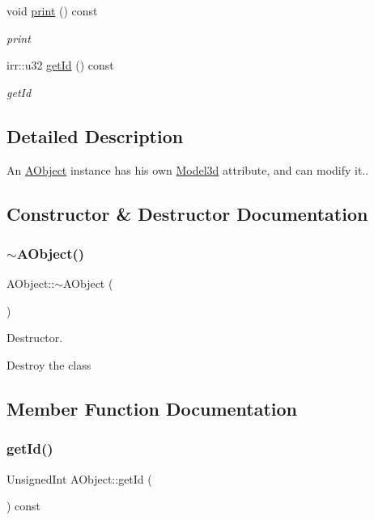 \begin{DoxyCompactItemize}
void \hyperlink{classAObject_aebbd61ad13e23fa7787a5cdf12acd4ca}{print} () const
\begin{DoxyCompactList}\small\item\em print \end{DoxyCompactList}\item 
irr\+::u32 \hyperlink{classAObject_acd8ce0e7b7009ec89998def42021b69f}{get\+Id} () const
\begin{DoxyCompactList}\small\item\em get\+Id \end{DoxyCompactList}\end{DoxyCompactItemize}


\subsection{Detailed Description}
An \hyperlink{classAObject}{A\+Object} instance has his own \hyperlink{classModel3d}{Model3d} attribute, and can modify it.. 

\subsection{Constructor \& Destructor Documentation}
\mbox{\label{classAObject_ac17f3a1944792c280a3cbd83d839bc4e}} 
\subsubsection{\texorpdfstring{$\sim$\+A\+Object()}{~AObject()}}
{\footnotesize\ttfamily A\+Object\+::$\sim$\+A\+Object (\begin{DoxyParamCaption}{ }\end{DoxyParamCaption})}



Destructor. 

Destroy the class 

\subsection{Member Function Documentation}
\mbox{\label{classAObject_acd8ce0e7b7009ec89998def42021b69f}} 
\subsubsection{\texorpdfstring{get\+Id()}{getId()}}
{\footnotesize\ttfamily Unsigned\+Int A\+Object\+::get\+Id (\begin{DoxyParamCaption}{ }\end{DoxyParamCaption}) const}



